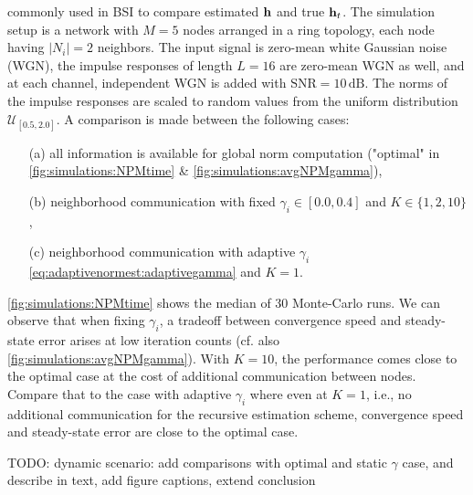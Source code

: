 \documentclass{article}
\begin{document}
commonly used in BSI to compare estimated \(\bm{\mathrm{h}}\) and true \(\bm{\mathrm{h}}_t\).
The simulation setup is a network with \(M=5\) nodes arranged in a ring topology, each node having \(|N_i|=2\) neighbors.
The input signal is zero-mean white Gaussian noise (WGN), the impulse responses of length \(L=16\) are zero-mean WGN as well, and at each channel, independent WGN is added with \(\text{SNR}=10\,\text{dB}\).
The norms of the impulse responses are scaled to random values from the uniform distribution \(\mathcal{U}_{[0.5,2.0]}\).
A comparison is made between the following cases:
\begin{itemize}
    \itemsep-0.2em
    \item[(a)] all information is available for global norm computation ("optimal" in \autoref{fig:simulations:NPMtime} \& \autoref{fig:simulations:avgNPMgamma}),
    \item[(b)] neighborhood communication with fixed \(\gamma_i \in [0.0, 0.4]\) and \(K \in \{1,2,10\}\),
    \item[(c)] neighborhood communication with adaptive \(\gamma_i\) \eqref{eq:adaptivenormest:adaptivegamma} and \(K=1\).
\end{itemize}
\autoref{fig:simulations:NPMtime} shows the median of 30 Monte-Carlo runs.
We can observe that when fixing \(\gamma_i\), a tradeoff between convergence speed and steady-state error arises at low iteration counts (cf. also \autoref{fig:simulations:avgNPMgamma}).
With \(K=10\), the performance comes close to the optimal case at the cost of additional communication between nodes.
Compare that to the case with adaptive \(\gamma_i\) where even at \(K=1\), i.e., no additional communication for the recursive estimation scheme, convergence speed and steady-state error are close to the optimal case.

\begin{todo}
    TODO: dynamic scenario: add comparisons with optimal and static \(\gamma\) case, and describe in text, add figure captions, extend conclusion
\end{todo}

\begin{figure}[t]
    \centering
    
    \caption[]{}
    \label{fig:simulations:NPMtimedyn}
\end{figure}
\begin{figure}[t]
    \centering
    
    \caption[]{}
    \label{fig:simulations:normtime}
\end{figure}
\begin{figure}[t]
    \centering
    
    \caption[]{}
    \label{fig:simulations:normstime}
\end{figure}
\end{document}
